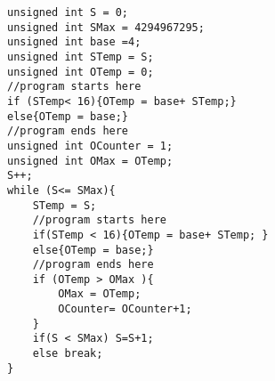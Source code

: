 \lstset{language=C}  
\begin{lstlisting}[caption={Implementation of the optimization with sanity check in C.},label=lst:2ndTry]
unsigned int S = 0;
unsigned int SMax = 4294967295;
unsigned int base =4;
unsigned int STemp = S;
unsigned int OTemp = 0;
//program starts here
if (STemp< 16){OTemp = base+ STemp;}
else{OTemp = base;}
//program ends here
unsigned int OCounter = 1;
unsigned int OMax = OTemp;
S++; 
while (S<= SMax){
	STemp = S;
	//program starts here
	if(STemp < 16){OTemp = base+ STemp;	}
	else{OTemp = base;}
	//program ends here
	if (OTemp > OMax ){
		OMax = OTemp;
		OCounter= OCounter+1;
	}
	if(S < SMax) S=S+1;
	else break;
}
\end{lstlisting}
